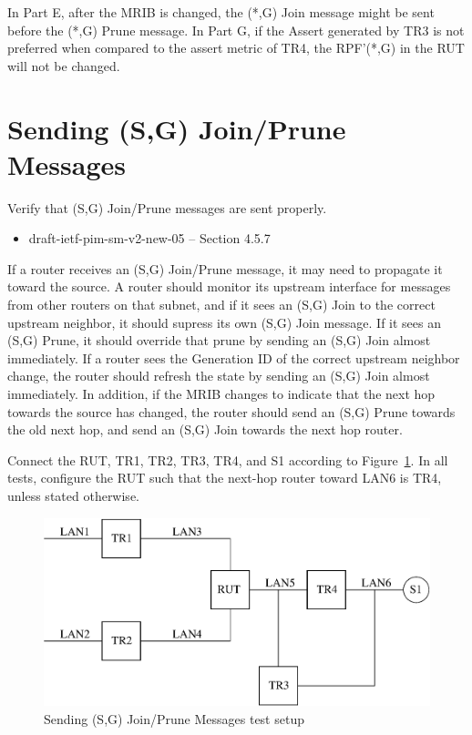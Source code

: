 \documentclass[11pt]{report}
\begin{document}
In Part E, after the MRIB is changed, the (*,G) Join message might
be sent before the (*,G) Prune message. In Part G, if the Assert generated by
TR3 is not preferred when compared to the assert metric of TR4, the RPF'(*,G)
in the RUT will not be changed.

\newpage
\section{Sending (S,G) Join/Prune Messages}

Verify that (S,G) Join/Prune messages are sent properly.

\begin{itemize}
  \item draft-ietf-pim-sm-v2-new-05 -- Section 4.5.7
\end{itemize}

If a router receives an (S,G) Join/Prune message, it may need to propagate
it toward the source. A router should monitor its upstream
interface for messages
from other routers on that subnet, and if it sees an (S,G) Join to the
correct upstream neighbor, it should supress its own (S,G) Join message.
If it sees an (S,G) Prune, it should override that prune by sending an
(S,G) Join almost immediately. If a router sees the Generation ID of the
correct upstream neighbor change, the router should refresh the state by
sending an (S,G) Join almost immediately. In addition, if the MRIB changes
to indicate that the next hop towards the source has changed, the router should
send an (S,G) Prune towards the old next hop, and send an (S,G) Join
towards the next hop router.

Connect the RUT, TR1, TR2, TR3, TR4, and S1 according to
Figure~\ref{fig:pim_test_4_7_sending_sg_join_prune_messages}.
In all tests, configure the RUT such that the next-hop router toward LAN6 is
TR4, unless stated otherwise.

\begin{figure}[htbp]
  \begin{center}
    \includegraphics[scale=0.8]{figs/pim_test_4_7_sending_sg_join_prune_messages}
    \caption{Sending (S,G) Join/Prune Messages test setup}
    \label{fig:pim_test_4_7_sending_sg_join_prune_messages}
  \end{center}
\end{figure}
\end{document}
